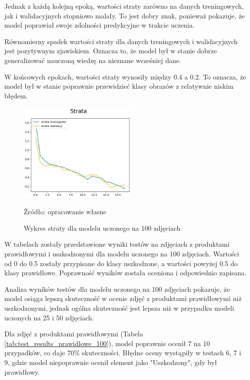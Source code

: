 Jednak z każdą kolejną epoką, wartości straty zarówno na danych treningowych, jak i walidacyjnych stopniowo malały. To jest dobry znak, ponieważ pokazuje, że model poprawiał swoje zdolności predykcyjne w trakcie uczenia.

Równomierny spadek wartości straty dla danych treningowych i walidacyjnych jest pozytywnym zjawiskiem. Oznacza to, że model był w stanie dobrze generalizować nauczoną wiedzę na nieznane wcześniej dane.

W końcowych epokach, wartości straty wynosiły między 0.4 a 0.2. To oznacza, że model był w stanie poprawnie przewidzieć klasy obrazów z relatywnie niskim błędem.

\begin{figure}[htbp]
  \centering
  \caption{Wykres straty dla modelu uczonego na 100 zdjęciach}
  \includegraphics[width=220px]{images/strata_100.png}
  \begin{center}
  \footnotesize{Źródło: opracowanie własne}
  \end{center}
  \label{fig:wykres_strata_100}
\end{figure}

W tabelach zostały przedstawione wyniki testów na zdjęciach z produktami prawidłowymi i uszkodzonymi dla modelu uczonego na 100 zdjęciach. Wartości od 0 do 0.5 zostały przypisane do klasy uszkodzone, a wartości powyżej 0.5 do klasy prawidłowe. Poprawność wyników została oceniona i odpowiednio zapisana.

Analiza wyników testów dla modelu uczonego na 100 zdjęciach pokazuje, że model osiąga lepszą skuteczność w ocenie zdjęć z produktami prawidłowymi niż uszkodzonymi, jednak ogólna skuteczność jest lepsza niż w przypadku modeli uczonych na 25 i 50 zdjęciach.

Dla zdjęć z produktami prawidłowymi (Tabela \ref{tab:test_results_prawidlowe_100}), model poprawnie ocenił 7 na 10 przypadków, co daje 70\% skuteczności. Błędne oceny wystąpiły w testach 6, 7 i 9, gdzie model niepoprawnie ocenił element jako "Uszkodzony", gdy był prawidłowy.

